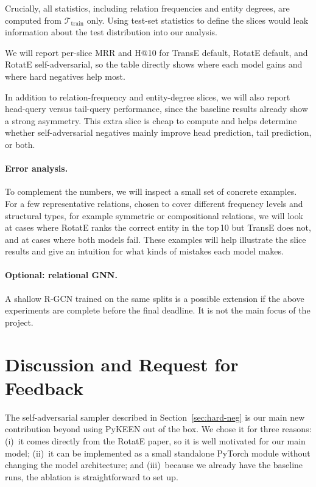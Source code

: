\documentclass{llncs}
\begin{document}
Crucially, all statistics, including relation frequencies and entity
degrees, are computed from $\mathcal{T}_{\text{train}}$ only.
Using test-set statistics to define the slices would leak information
about the test distribution into our analysis.

We will report per-slice MRR and H@10 for TransE default, RotatE default,
and RotatE self-adversarial, so the table directly shows where each model
gains and where hard negatives help most.

In addition to relation-frequency and entity-degree slices, we will also
report head-query versus tail-query performance, since the baseline results
already show a strong asymmetry.
This extra slice is cheap to compute and helps determine whether
self-adversarial negatives mainly improve head prediction, tail prediction,
or both.

\paragraph{Error analysis.}
To complement the numbers, we will inspect a small set of concrete
examples.
For a few representative relations, chosen to cover different frequency
levels and structural types, for example symmetric or compositional
relations, we will look at cases where RotatE ranks the correct entity in
the top\,10 but TransE does not, and at cases where both models fail.
These examples will help illustrate the slice results and give an
intuition for what kinds of mistakes each model makes.

\paragraph{Optional: relational GNN.}
A shallow R-GCN trained on the same
splits is a possible extension if the above experiments are complete
before the final deadline.
It is not the main focus of the project.

\section{Discussion and Request for Feedback}

The self-adversarial sampler described in Section~\ref{sec:hard-neg} is
our main new contribution beyond using PyKEEN out of the box.
We chose it for three reasons: (i)~it comes directly from the RotatE
paper, so it is well motivated for our main model; (ii)~it can be
implemented as a small standalone PyTorch module without changing the
model architecture; and (iii)~because we already have the baseline runs,
the ablation is straightforward to set up.
\end{document}
